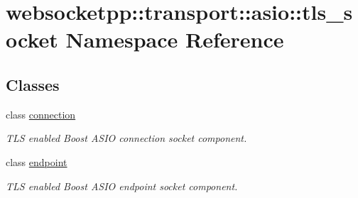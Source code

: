 \hypertarget{namespacewebsocketpp_1_1transport_1_1asio_1_1tls__socket}{}\section{websocketpp\+:\+:transport\+:\+:asio\+:\+:tls\+\_\+socket Namespace Reference}
\label{namespacewebsocketpp_1_1transport_1_1asio_1_1tls__socket}
\subsection*{Classes}
\begin{DoxyCompactItemize}
\item 
class \hyperlink{classwebsocketpp_1_1transport_1_1asio_1_1tls__socket_1_1connection}{connection}
\begin{DoxyCompactList}\small\item\em T\+LS enabled Boost A\+S\+IO connection socket component. \end{DoxyCompactList}\item 
class \hyperlink{classwebsocketpp_1_1transport_1_1asio_1_1tls__socket_1_1endpoint}{endpoint}
\begin{DoxyCompactList}\small\item\em T\+LS enabled Boost A\+S\+IO endpoint socket component. \end{DoxyCompactList}\end{DoxyCompactItemize}
